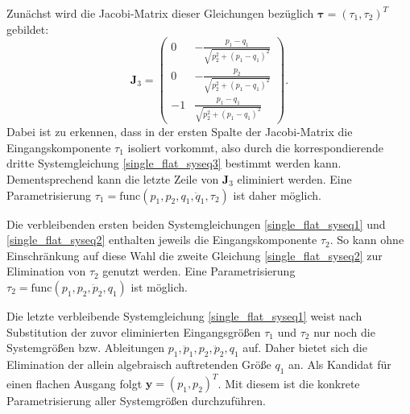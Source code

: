 Zunächst wird die Jacobi-Matrix dieser Gleichungen bezüglich $\boldsymbol{\tau} = (\tau_1, \tau_2)^T$ gebildet:
\begin{equation}
	\mathbf{J}_3 =
	\left(\begin{matrix}
		0 & - \frac{p_{1} - q_{1}}{\sqrt{p_{2}^{2} + \left(p_{1} - q_{1}\right)^{2}}}\\
		0 & - \frac{p_{2}}{\sqrt{p_{2}^{2} + \left(p_{1} - q_{1}\right)^{2}}}\\
		-1 & \frac{p_{1} - q_{1}}{\sqrt{p_{2}^{2} + \left(p_{1} - q_{1}\right)^{2}}}
	\end{matrix}\right).
\end{equation}
Dabei ist zu erkennen, dass in der ersten Spalte der Jacobi-Matrix die Eingangskomponente $\tau_{1}$ isoliert vorkommt, also durch die korrespondierende dritte Systemgleichung \eqref{single_flat_syseq3} bestimmt werden kann. Dementsprechend kann die letzte Zeile von $\mathbf{J}_3$ eliminiert werden. Eine Parametrisierung $\tau_1 = \mathrm{func}(p_1, p_2, q_1, \ddot{q}_1, \tau_2)$ ist daher möglich.

Die verbleibenden ersten beiden Systemgleichungen \eqref{single_flat_syseq1} und \eqref{single_flat_syseq2} enthalten jeweils die Eingangskomponente $\tau_2$. So kann ohne Einschränkung auf diese Wahl die zweite Gleichung \eqref{single_flat_syseq2} zur Elimination von $\tau_2$ genutzt werden. Eine Parametrisierung ${\tau_2 = \mathrm{func}(p_1, p_2, \ddot{p}_2, q_1)}$ ist möglich.

Die letzte verbleibende Systemgleichung \eqref{single_flat_syseq1} weist nach Substitution der zuvor eliminierten Eingangsgrößen $\tau_1$ und $\tau_2$ nur noch die Systemgrößen bzw. Ableitungen $p_1, \ddot{p}_1, p_2, \ddot{p}_2, q_1$ auf. Daher bietet sich die Elimination der allein algebraisch auftretenden Größe $q_1$ an. Als Kandidat für einen flachen Ausgang folgt
$\mathbf{y} = (p_1, p_2)^T$. Mit diesem ist die konkrete Parametrisierung aller Systemgrößen durchzuführen.

